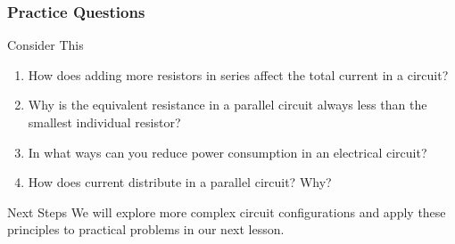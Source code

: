 \documentclass{beamer}
\begin{document}
\begin{frame}
\frametitle{Practice Questions}
\begin{block}{Consider This}
\begin{enumerate}
\item How does adding more resistors in series affect the total current in a circuit?
\item Why is the equivalent resistance in a parallel circuit always less than the smallest individual resistor?
\item In what ways can you reduce power consumption in an electrical circuit?
\item How does current distribute in a parallel circuit? Why?
\end{enumerate}
\end{block}

\begin{block}{Next Steps}
We will explore more complex circuit configurations and apply these principles to practical problems in our next lesson.
\end{block}
\end{frame}
\end{document}
